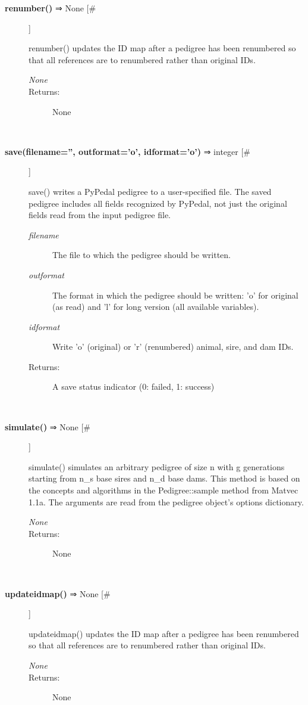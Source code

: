 \begin{description}
\item[\textbf{renumber()} ⇒ None [\#]
]
\par renumber() updates the ID map after a pedigree has been renumbered so that all references
are to renumbered rather than original IDs.
\begin{description}
\item[\textit{None}
]

\item[Returns:
]
None
\end{description}\\

\item[\textbf{save(filename='', outformat='o', idformat='o')} ⇒ integer [\#]
]
\par save() writes a PyPedal pedigree to a user-specified file.  The saved pedigree includes
all fields recognized by PyPedal, not just the original fields read from the input pedigree
file.
\begin{description}
\item[\textit{filename}
]
The file to which the pedigree should be written.
\item[\textit{outformat}
]
The format in which the pedigree should be written: 'o' for original (as read) and 'l' for long version (all available variables).
\item[\textit{idformat}
]
Write 'o' (original) or 'r' (renumbered) animal, sire, and dam IDs.
\item[Returns:
]
A save status indicator (0: failed, 1: success)
\end{description}\\

\item[\textbf{simulate()} ⇒ None [\#]
]
\par simulate() simulates an arbitrary pedigree of size n with g generations
starting from n\_s base sires and n\_d base dams.  This method is based on
the concepts and algorithms in the Pedigree::sample method from Matvec
1.1a.  The arguments are read from the pedigree object's options
dictionary.
\begin{description}
\item[\textit{None}
]

\item[Returns:
]
None
\end{description}\\

\item[\textbf{updateidmap()} ⇒ None [\#]
]
\par updateidmap() updates the ID map after a pedigree has been renumbered so that all references
are to renumbered rather than original IDs.
\begin{description}
\item[\textit{None}
]

\item[Returns:
]
None
\end{description}\\

\end{description}
